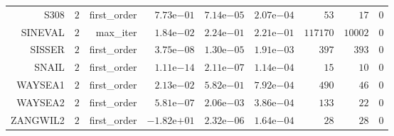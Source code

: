 \begin{longtable}{rrrrrrrrr}
S308 & \(     2\) & first\_order & \( 7.73\)e\(-01\) & \( 7.14\)e\(-05\) & \( 2.07\)e\(-04\) & \(    53\) & \(    17\) & \(     0\) \\
SINEVAL & \(     2\) & max\_iter & \( 1.84\)e\(-02\) & \( 2.24\)e\(-01\) & \( 2.21\)e\(-01\) & \(117170\) & \( 10002\) & \(     0\) \\
SISSER & \(     2\) & first\_order & \( 3.75\)e\(-08\) & \( 1.30\)e\(-05\) & \( 1.91\)e\(-03\) & \(   397\) & \(   393\) & \(     0\) \\
SNAIL & \(     2\) & first\_order & \( 1.11\)e\(-14\) & \( 2.11\)e\(-07\) & \( 1.14\)e\(-04\) & \(    15\) & \(    10\) & \(     0\) \\
WAYSEA1 & \(     2\) & first\_order & \( 2.13\)e\(-02\) & \( 5.82\)e\(-01\) & \( 7.92\)e\(-04\) & \(   490\) & \(    46\) & \(     0\) \\
WAYSEA2 & \(     2\) & first\_order & \( 5.81\)e\(-07\) & \( 2.06\)e\(-03\) & \( 3.86\)e\(-04\) & \(   133\) & \(    22\) & \(     0\) \\
ZANGWIL2 & \(     2\) & first\_order & \(-1.82\)e\(+01\) & \( 2.32\)e\(-06\) & \( 1.64\)e\(-04\) & \(    28\) & \(    28\) & \(     0\) \\\hline
\end{longtable}
